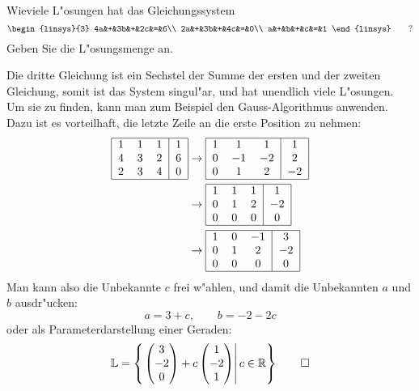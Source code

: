 Wieviele L"osungen hat das Gleichungssystem
\[
\begin{linsys}{3}
4a&+&3b&+&2c&=&6\\
2a&+&3b&+&4c&=&0\\
a&+&b&+&c&=&1
\end{linsys}
\qquad
?
\]
Geben Sie die L"osungsmenge an.

\begin{loesung}
Die dritte Gleichung ist ein Sechstel der Summe der ersten und der
zweiten Gleichung, somit ist das System singul"ar, und hat unendlich
viele L"osungen. Um sie zu finden, kann man zum Beispiel den Gauss-Algorithmus
anwenden. Dazu ist es vorteilhaft, die letzte Zeile an die erste
Position zu nehmen:
\begin{align*}
\begin{tabular}{|ccc|c|}
\hline
1&1&1&1\\
4&3&2&6\\
2&3&4&0\\
\hline
\end{tabular}
&
\rightarrow
\begin{tabular}{|ccc|c|}
\hline
1&1&1&1\\
0&$-1$&$-2$&2\\
0&1&2&$-2$\\
\hline
\end{tabular}
\\
&
\rightarrow
\begin{tabular}{|ccc|c|}
\hline
1&1&1&1\\
0&1&2&$-2$\\
0&0&0&0\\
\hline
\end{tabular}
\\
&
\rightarrow
\begin{tabular}{|ccc|c|}
\hline
1&0&$-1$&3\\
0&1&2&$-2$\\
0&0&0&0\\
\hline
\end{tabular}
\end{align*}
Man kann also die Unbekannte $c$ frei w"ahlen, und damit die Unbekannten
$a$ und $b$ ausdr"ucken:
\[
a=3+c,\qquad b=-2-2c
\]
oder als Parameterdarstellung einer Geraden:
\[
\mathbb L =\left\{\left.
\begin{pmatrix}
3\\-2\\0
\end{pmatrix}
+c\begin{pmatrix}
1\\-2\\1
\end{pmatrix}\right | c\in \mathbb R
\right\}
\qedhere
\]
\end{loesung}

